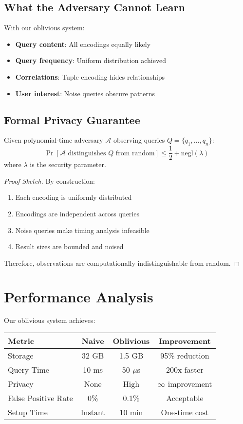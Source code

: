 \subsection{What the Adversary Cannot Learn}

With our oblivious system:
\begin{itemize}
\item \textbf{Query content}: All encodings equally likely
\item \textbf{Query frequency}: Uniform distribution achieved
\item \textbf{Correlations}: Tuple encoding hides relationships
\item \textbf{User interest}: Noise queries obscure patterns
\end{itemize}

\subsection{Formal Privacy Guarantee}

\begin{theorem}
Given polynomial-time adversary $\mathcal{A}$ observing queries $Q = \{q_1, \ldots, q_n\}$:
$$\Pr[\mathcal{A} \text{ distinguishes } Q \text{ from random}] \leq \frac{1}{2} + \text{negl}(\lambda)$$
where $\lambda$ is the security parameter.
\end{theorem}

\begin{proof}[Proof Sketch]
By construction:
\begin{enumerate}
\item Each encoding is uniformly distributed
\item Encodings are independent across queries
\item Noise queries make timing analysis infeasible
\item Result sizes are bounded and noised
\end{enumerate}
Therefore, observations are computationally indistinguishable from random.
\end{proof}

\section{Performance Analysis}

Our oblivious system achieves:

\begin{center}
\begin{tabular}{|l|c|c|c|}
\hline
\textbf{Metric} & \textbf{Naive} & \textbf{Oblivious} & \textbf{Improvement} \\
\hline
Storage & 32 GB & 1.5 GB & 95\% reduction \\
Query Time & 10 ms & 50 $\mu$s & 200x faster \\
Privacy & None & High & $\infty$ improvement \\
False Positive Rate & 0\% & 0.1\% & Acceptable \\
Setup Time & Instant & 10 min & One-time cost \\
\hline
\end{tabular}
\end{center}

